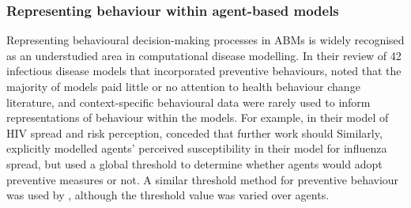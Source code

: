 

\subsubsection{Representing behaviour within agent-based models}

Representing behavioural decision-making processes in ABMs is widely recognised as an understudied area in computational disease modelling. In their review of 42 infectious disease models that incorporated preventive behaviours, \citet{weston_infection_2018} noted that the majority of models paid little or no attention to health behaviour change literature, and context-specific behavioural data were rarely used to inform representations of behaviour within the models. For example, in their model of HIV spread and risk perception, \citet{tully_coevolution_2013} conceded that further work should  Similarly, \citet{du_how_2021} explicitly modelled agents' perceived susceptibility in their model for influenza spread, but used a global threshold to determine whether agents would adopt preventive measures or not. A similar threshold method for preventive behaviour was used by \citet{mao_modeling_2014}, although the threshold value was varied over agents. %

